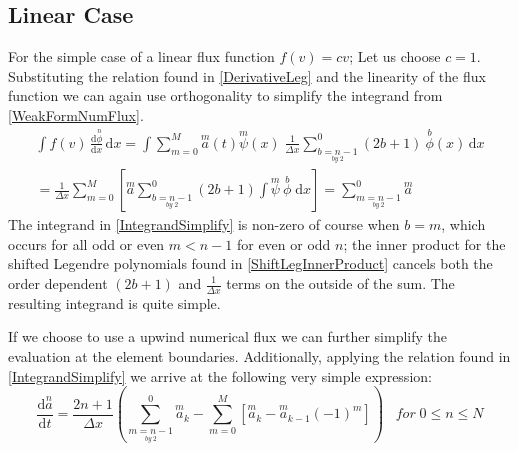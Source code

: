 \documentclass[letterpaper]{article}
\begin{document}
\subsection{Linear Case}
For the simple case of a linear flux function $f(v) = cv$; Let us choose $c=1$. Substituting the relation found in \eqref{DerivativeLeg} and the linearity of the flux function we can again use orthogonality to simplify the integrand from \eqref{WeakFormNumFlux}.
	\begin{equation}\label{IntegrandSimplify}
	\begin{split}
	\int\! f(v) \,\frac{\mathrm{d} \overset{n}{\phi}}{\mathrm{d} x} \,\mathrm{d}x
	= \int \sum_{m=0}^M \overset{m}{a}(t)\overset{m}{\psi}(x) \;\frac{1}{\Delta x} \sum_{\underset{by \; 2}{b=n-1}}^0 (2b+1) \:\overset{b}{\phi}(x) \,\mathrm{d}x \\
	=\frac{1}{\Delta x} \sum_{m=0}^M \left[\overset{m}{a} \sum_{\underset{by \; 2}{b=n-1}}^0 (2b+1) \int \overset{m}{\psi} \:\overset{b}{\phi} \;\mathrm{d}x \right]
	=\sum_{\underset{by \: 2}{m=n-1}}^0 \overset{m}{a}
	\end{split}
	\end{equation}
The integrand in \eqref{IntegrandSimplify} is non-zero of course when $b=m$, which occurs for all odd or even $m<n-1$ for even or odd $n$; the inner product for the shifted Legendre polynomials found in \eqref{ShiftLegInnerProduct} cancels both the order dependent $(2b+1)$ and $\frac{1}{\Delta x}$ terms on the outside of the sum. The resulting integrand is quite simple.

If we choose to use a upwind numerical flux we can further simplify the evaluation at the element boundaries. Additionally, applying the relation found in \eqref{IntegrandSimplify} we arrive at the following very simple expression:
	\begin{equation}\label{WeakFormLinear}
	\frac{\mathrm{d}\overset{n}{a}}{\mathrm{d} t}
	=\frac{2n+1}{\Delta x} \left( \sum_{\underset{by \: 2}{m=n-1}}^0 \overset{m}{a}_k
	-\sum_{m=0}^M \left[ \overset{m}{a}_k - \overset{m}{a}_{k-1}(-1)^m \right]\right)
	\;\;\; for \; 0 \leq n \leq N
	\end{equation}
\end{document}
